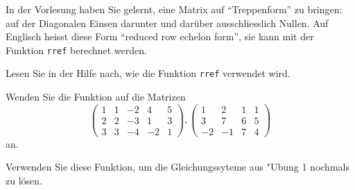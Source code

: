 In der Vorlesung haben Sie gelernt, eine Matrix auf ``Treppenform''
zu bringen: auf der Diagonalen Einsen darunter und darüber
ausschliesslich Nullen. Auf Englisch heisst diese Form ``reduced
row echelon form'', sie kann mit der Funktion {\tt rref} berechnet
werden.
\begin{teilaufgaben}
\item Lesen Sie in der Hilfe nach, wie die Funktion {\tt rref}
verwendet wird.
\item Wenden Sie die Funktion auf die Matrizen
\[
\begin{pmatrix}
1&1&-2&4&5\\
2&2&-3&1&3\\
3&3&-4&-2&1
\end{pmatrix},
\begin{pmatrix}
1&2&1&1\\
3&7&6&5\\
-2&-1&7&4
\end{pmatrix}
\]
an.
\item
Verwenden Sie diese Funktion, um die Gleichungssyteme aus "Ubung
1 nochmals zu lösen.
\end{teilaufgaben}


\begin{loesung}
\begin{teilaufgaben}
\item
\item
{}
\end{teilaufgaben}
\end{loesung}


